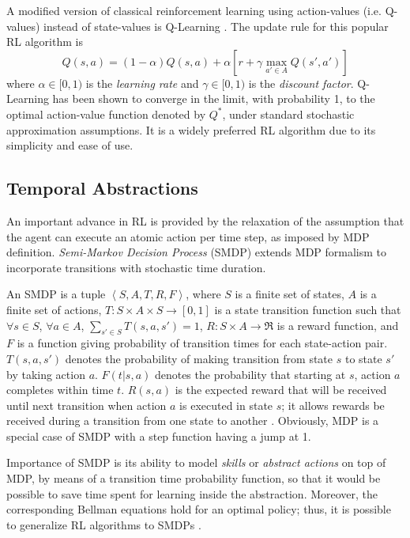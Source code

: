 \documentclass[10pt, conference, compsocconf]{IEEEtran}
\begin{document}
A modified version of classical reinforcement learning using action-values (i.e. Q-values) instead of state-values is Q-Learning \cite{watkins_learning_1989}. 
The update rule for this popular RL algorithm is
\begin{equation}
\label{eqn:Q_update_rule}
Q (s, a) = (1-\alpha)Q (s, a) + \alpha[r + \gamma \max_{a' \in A} Q(s',a')]
\end{equation}
where $\alpha \in [0, 1)$ is the \textit{learning rate} and $\gamma \in [0, 1)$ is the \textit{discount factor}. Q-Learning has been shown to converge in the limit, with probability 1, to the optimal action-value function denoted by $Q^*$, under standard stochastic approximation assumptions. It is a widely preferred RL algorithm due to its simplicity and ease of use.


\subsection{Temporal Abstractions}
\label{sec:temporal_abstractions}

An important advance in RL is provided by the relaxation of the assumption that the agent can execute an atomic action per time step, as imposed by MDP definition. \textit{Semi-Markov Decision Process} (SMDP) extends MDP formalism  to incorporate transitions with stochastic time duration. 

An SMDP is a tuple $\left\langle S, A, T, R, F\right\rangle $, where $S$ is a finite set of states, $A$ is a finite set of actions, $T : S\times A \times S \rightarrow [0, 1]$ is a state transition function such that $\forall s \in S$, $\forall a \in A$, $\sum_{s' \in S} T\left( s, a, s'\right) = 1$, $R : S \times A \rightarrow \Re$ is a reward function, and $F$ is a function giving probability of transition times for each state-action pair. $T(s, a, s')$ denotes the probability of making  transition from state $s$ to state $s'$ by taking action $a$. $F(t|s, a)$ denotes the probability that starting at $s$, action $a$ completes within time $t$. $R(s, a)$ is the expected reward that will be received until next transition when action $a$ is executed in state $s$; it allows rewards be received during a transition from one state to another \cite{bradtke_reinforcement_1994}. Obviously, MDP is a special case of SMDP with a step function having a jump at 1.

Importance of SMDP is its ability to model \textit{skills} or \textit{abstract actions} on top of MDP, by means of a transition time probability function, so that it would be possible to save time spent for learning inside the abstraction. Moreover, the corresponding Bellman equations hold for an optimal policy; thus, it is possible to generalize RL algorithms to SMDPs \cite{bradtke_reinforcement_1994,parr_hierarchical_1998}.
\end{document}
